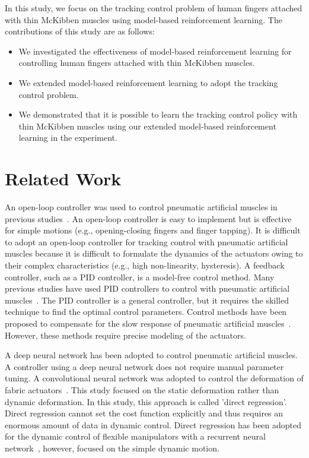 \documentclass[letterpaper, 10 pt, conference]{ieeeconf}  %
\begin{document}
In this study, we focus on the tracking control problem of human fingers attached with thin McKibben muscles using model-based reinforcement learning. The contributions of this study are as follows:
\begin{itemize}
    \item We investigated the effectiveness of model-based reinforcement learning for controlling human fingers attached with thin McKibben muscles.
    \item We extended model-based reinforcement learning to adopt the tracking control problem.
    \item We demonstrated that it is possible to learn the tracking control policy with thin McKibben muscles using our extended model-based reinforcement learning in the experiment.
\end{itemize}

\section{Related Work}
An open-loop controller was used to control pneumatic artificial muscles in previous studies~\cite{wang2020sensor, koizumi2020soft}. An open-loop controller is easy to implement but is effective for simple motions (e.g., opening-closing fingers and finger tapping). It is difficult to adopt an open-loop controller for tracking control with pneumatic artificial muscles because it is difficult to formulate the dynamics of the actuators owing to their complex characteristics (e.g., high non-linearity, hysteresis). A feedback controller, such as a PID controller, is a model-free control method. Many previous studies have used PID controllers to control with pneumatic artificial muscles~\cite{faudzi2016modeling, hafidz2022control, endo2020flexible, buchler2016lightweight}. The PID controller is a general controller, but it requires the skilled technique to find the optimal control parameters. Control methods have been proposed to compensate for the slow response of pneumatic artificial muscles~\cite{suzuki2018novel, melkou2019high}. However, these methods require precise modeling of the actuators.

A deep neural network has been adopted to control pneumatic artificial muscles. A controller using a deep neural network does not require manual parameter tuning. A convolutional neural network was adopted to control the deformation of fabric actuators~\cite{yamaguchi2020three}. This study focused on the static deformation rather than dynamic deformation. In this study, this approach is called 'direct regression'. Direct regression cannot set the cost function explicitly and thus requires an enormous amount of data in dynamic control. Direct regression has been adopted for the dynamic control of flexible manipulators with a recurrent neural network~\cite{kawaharazuka2019dyamic}, however, \cite{kawaharazuka2019dyamic} focused on the simple dynamic motion.
\end{document}
